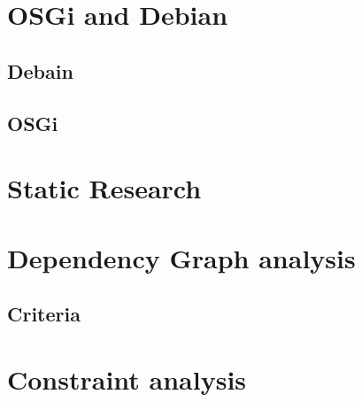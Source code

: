 
\section{OSGi and Debian}

\subsection{Debain}


\subsection{OSGi}

\section{Static Research}


\section{Dependency Graph analysis}

\subsection{Criteria}




\section{Constraint analysis}

